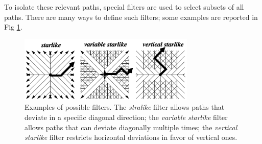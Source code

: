 To isolate these relevant paths, special filters are used to select subsets of all paths. There are many ways to define such filters; some examples are reported in Fig \ref{fig:trend_filters}.
\begin{figure}[!ht]
    \centering
    \includegraphics[width=0.75\textwidth]{img/trend_filters.png}
    \caption{Examples of possible filters. The \textit{stralike} filter allows paths that deviate in a specific diagonal direction; the \textit{variable starlike} filter allows paths that can deviate diagonally multiple times; the \textit{vertical starlike} filter restricts horizontal deviations in favor of vertical ones.}
    \label{fig:trend_filters}
\end{figure}